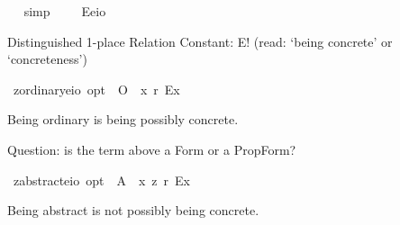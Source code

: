 \begin{isabellebody}
\isadelimproof
\ %
\endisadelimproof
%
\isatagproof
{}\isamarkupfalse%
\ {\isacharparenleft}simp{\isacharparenright}%
\endisatagproof
{\isafoldproof}%
%
\isadelimproof
%
\endisadelimproof
\ \isamarkupfalse%
%
\isadelimproof
\ %
\endisadelimproof
%
\isatagproof
{}\isamarkupfalse%
%
\endisatagproof
{\isafoldproof}%
%
\isadelimproof
%
\endisadelimproof
%
\isamarkuptrue%
\isamarkupfalse%
\ E{\isacharcolon}{\isacharcolon}{\isachardoublequoteopen}{\isacharparenleft}e{\isasymRightarrow}io{\isacharparenright}{\isachardoublequoteclose}%
\begin{isamarkuptext}%
Distinguished 1-place Relation Constant: E! (read: ‘being concrete’ or ‘concreteness’)%
\end{isamarkuptext}%
\isamarkuptrue%
\isamarkupfalse%
\ z{\isacharunderscore}ordinary{\isacharcolon}{\isacharcolon}{\isachardoublequoteopen}{\isacharparenleft}e{\isasymRightarrow}io{\isacharparenright}\ opt{\isachardoublequoteclose}\ \ {\isachardoublequoteopen}O\isactrlsup {\isacharbang}\ {\isasymequiv}\ {\isasymlambda}x{\isachardot}\ {\isasymdiamond}\isactrlsup r\ {\isacharless}{\isachardot}E{\isachardot}{\isasymbullet}{\isachardot}x{\isachardot}{\isachargreater}{\isacharparenright}{\isachardoublequoteclose}%
\begin{isamarkuptext}%
Being ordinary is being possibly concrete.%
\end{isamarkuptext}%
\isamarkuptrue%
%
\begin{isamarkuptext}%
Question: is the term above a Form or a PropForm?%
\end{isamarkuptext}%
\isamarkuptrue%
\isamarkupfalse%
\ z{\isacharunderscore}abstract{\isacharcolon}{\isacharcolon}{\isachardoublequoteopen}{\isacharparenleft}e{\isasymRightarrow}io{\isacharparenright}\ opt{\isachardoublequoteclose}\ \ {\isachardoublequoteopen}A\isactrlsup {\isacharbang}\ {\isasymequiv}\ {\isasymlambda}x{\isachardot}\ {\isasymnot}\isactrlsup z\ {\isasymdiamond}\isactrlsup r\ {\isacharless}{\isachardot}E{\isachardot}{\isasymbullet}{\isachardot}x{\isachardot}{\isachargreater}{\isacharparenright}{\isachardoublequoteclose}%
\begin{isamarkuptext}%
Being abstract is not possibly being concrete.%
\end{isamarkuptext}%

\end{isabellebody}

